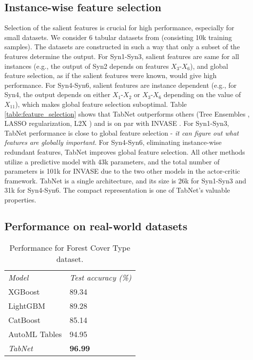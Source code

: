 \subsection{Instance-wise feature selection}
\label{performance_section}
\vspace{0cm}
Selection of the salient features is crucial for high performance, especially for small datasets. We consider 6 tabular datasets from \citep{l2x} (consisting 10k training samples). The datasets are constructed in such a way that only a subset of the features determine the output. For Syn1-Syn3, salient features are same for all instances (e.g., the output of Syn2 depends on features $X_3$-$X_6$), and global feature selection, as if the salient features were known, would give high performance. For Syn4-Syn6, salient features are instance dependent (e.g., for Syn4, the output depends on either $X_1$-$X_2$ or $X_3$-$X_6$ depending on the value of $X_{11}$), which makes global feature selection suboptimal.
Table \ref{table:feature_selection} shows that TabNet outperforms others (Tree Ensembles \citep{Geurts2006}, LASSO regularization, L2X \citep{l2x}) and is on par with INVASE \citep{invase}. For Syn1-Syn3, TabNet performance is close to global feature selection - \emph{it can figure out what features are globally important}. For Syn4-Syn6, eliminating instance-wise redundant features, TabNet improves global feature selection.
All other methods utilize a predictive model with 43k parameters, and the total number of parameters is 101k for INVASE due to the two other models in the actor-critic framework. TabNet is a single architecture, and its size is 26k for Syn1-Syn3 and 31k for Syn4-Syn6. The compact representation is one of TabNet's valuable properties. 

\vspace{0cm}
\subsection{Performance on real-world datasets} 

\bgroup
\def\arraystretch{0.95}
\begin{table}[h!]
\vspace{0cm}
\caption{Performance for Forest Cover Type dataset.}
\vspace{0cm}
\centering
\begin{tabular}{|C{4.9 cm}|C{2.5 cm}|}
\textit{Model} & \textit{Test accuracy (\%)}        \\ 
XGBoost &  89.34                \\ 
LightGBM  & 89.28              \\ 
CatBoost & 85.14              \\  
AutoML Tables  & 94.95                  \\ 
\textit{TabNet}  &  \textbf{96.99}  \\ 
\end{tabular}
\label{table:covertype}
\end{table}
\egroup

